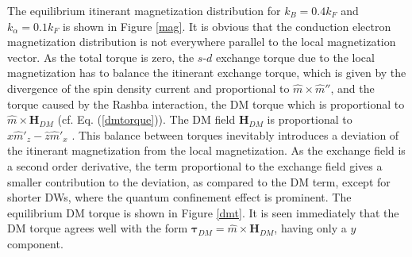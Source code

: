 \documentclass[12pt]{iopart}
\begin{document}
The equilibrium itinerant magnetization distribution for $k_B = 0.4 k_F$ and $k_\alpha = 0.1 k_F$ is shown in Figure \ref{mag}. It is obvious that the conduction electron magnetization distribution is not everywhere parallel to the local magnetization vector. As the total torque is zero, the $s$-$d$ exchange torque due to the local magnetization has to balance the itinerant exchange torque, which is given by the divergence of the spin density current and proportional to $\hat {m} \times \hat{m}''$, and the torque caused by the Rashba interaction, the DM torque which is proportional to $\hat {m} \times \textbf{H}_ {DM}$ (cf. Eq. (\ref{dmtorque})). The DM field $\textbf{H}_ {DM}$ is proportional to $\hat{x} \hat {m}'_z - \hat{z} \hat {m}'_x$ \cite{Bogdanov89,Bogdanov94,DMfield}. This balance between torques inevitably introduces a deviation of the itinerant magnetization from the local magnetization. As the exchange field is a second order derivative, the term proportional to the exchange field gives a smaller contribution to the deviation, as compared to the DM term, except for shorter DWs, where the quantum confinement effect is prominent. The equilibrium DM torque is shown in Figure \ref{dmt}. It is seen immediately that the DM torque agrees well with the form $\bm {\tau}_ {DM} = \hat {m} \times \textbf{H}_ {DM}$, having only a $y$ component.
\end{document}
